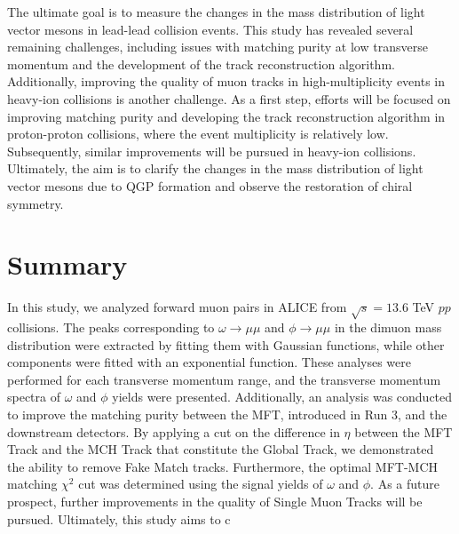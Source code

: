     The ultimate goal is to measure the changes in the mass distribution of light vector mesons in lead-lead collision events. This study has revealed several remaining challenges, including issues with matching purity at low transverse momentum and the development of the track reconstruction algorithm. Additionally, improving the quality of muon tracks in high-multiplicity events in heavy-ion collisions is another challenge. As a first step, efforts will be focused on improving matching purity and developing the track reconstruction algorithm in proton-proton collisions, where the event multiplicity is relatively low. Subsequently, similar improvements will be pursued in heavy-ion collisions. Ultimately, the aim is to clarify the changes in the mass distribution of light vector mesons due to QGP formation and observe the restoration of chiral symmetry.
\section{Summary}
    In this study, we analyzed forward muon pairs in ALICE from $\sqrt{s} = 13.6$ TeV $pp$ collisions. The peaks corresponding to $\omega \rightarrow \mu\mu$ and $\phi \rightarrow \mu\mu$ in the dimuon mass distribution were extracted by fitting them with Gaussian functions, while other components were fitted with an exponential function. These analyses were performed for each transverse momentum range, and the transverse momentum spectra of $\omega$ and $\phi$ yields were presented. Additionally, an analysis was conducted to improve the matching purity between the MFT, introduced in Run 3, and the downstream detectors. By applying a cut on the difference in $\eta$ between the MFT Track and the MCH Track that constitute the Global Track, we demonstrated the ability to remove Fake Match tracks. Furthermore, the optimal MFT-MCH matching $\chi^2$ cut was determined using the signal yields of $\omega$ and $\phi$. As a future prospect, further improvements in the quality of Single Muon Tracks will be pursued. Ultimately, this study aims to c